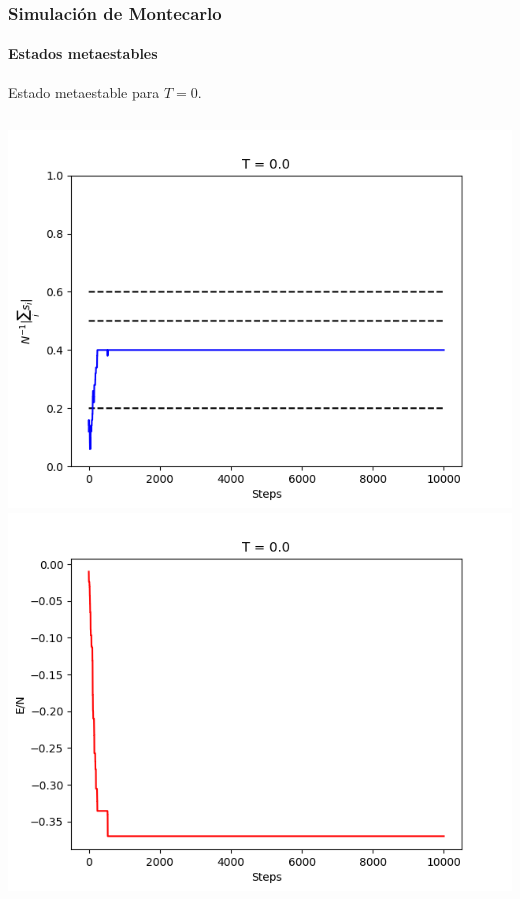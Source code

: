 \documentclass[11pt]{beamer}
\begin{document}
\begin{frame}
\frametitle{Simulación de Montecarlo}
\framesubtitle{Estados metaestables}
Estado metaestable para $T = 0$.
\begin{columns}
 \includegraphics[width=\linewidth]{magnet_meta_T=0,0.png}
 \includegraphics[width=\linewidth]{ener_meta_T=0,0.png}
\end{columns}
\end{frame}
\end{document}
